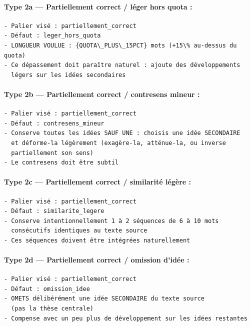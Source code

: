 \paragraph{Type 2a — Partiellement correct / léger hors quota :}
\begin{lstlisting}[caption=Prompt utilisateur — partiellement correct (hors quota léger)]
- Palier visé : partiellement_correct
- Défaut : leger_hors_quota
- LONGUEUR VOULUE : {QUOTA\_PLUS\_15PCT} mots (+15\% au-dessus du quota)
- Ce dépassement doit paraître naturel : ajoute des développements
  légers sur les idées secondaires
\end{lstlisting}

\paragraph{Type 2b — Partiellement correct / contresens mineur :}
\begin{lstlisting}[caption=Prompt utilisateur — partiellement correct (contresens mineur)]
- Palier visé : partiellement_correct
- Défaut : contresens_mineur
- Conserve toutes les idées SAUF UNE : choisis une idée SECONDAIRE
  et déforme-la légèrement (exagère-la, atténue-la, ou inverse
  partiellement son sens)
- Le contresens doit être subtil
\end{lstlisting}

\paragraph{Type 2c — Partiellement correct / similarité légère :}
\begin{lstlisting}[caption=Prompt utilisateur — partiellement correct (similarité légère)]
- Palier visé : partiellement_correct
- Défaut : similarite_legere
- Conserve intentionnellement 1 à 2 séquences de 6 à 10 mots
  consécutifs identiques au texte source
- Ces séquences doivent être intégrées naturellement
\end{lstlisting}

\paragraph{Type 2d — Partiellement correct / omission d'idée :}
\begin{lstlisting}[caption=Prompt utilisateur — partiellement correct (omission d'idée)]
- Palier visé : partiellement_correct
- Défaut : omission_idee
- OMETS délibérément une idée SECONDAIRE du texte source
  (pas la thèse centrale)
- Compense avec un peu plus de développement sur les idées restantes
\end{lstlisting}

